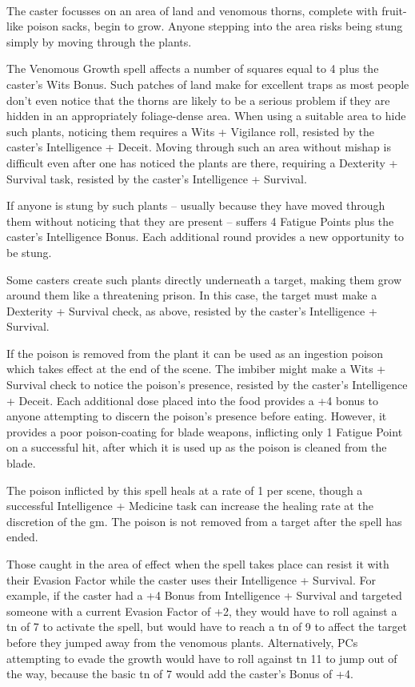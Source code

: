 \documentclass[titlepage,a4paper,openany]{book}
\begin{document}
\begin{multicols}{2}
\\
The caster focusses on an area of land and venomous thorns, complete with fruit-like poison sacks, begin to grow. Anyone stepping into the area risks being stung simply by moving through the plants.

The Venomous Growth spell affects a number of squares equal to 4 plus the caster's Wits Bonus. Such patches of land make for excellent traps as most people don't even notice that the thorns are likely to be a serious problem if they are hidden in an appropriately foliage-dense area. When using a suitable area to hide such plants, noticing them requires a Wits + Vigilance roll, resisted by the caster's Intelligence + Deceit. Moving through such an area without mishap is difficult even after one has noticed the plants are there, requiring a Dexterity + Survival task, resisted by the caster's Intelligence + Survival.

If anyone is stung by such plants -- usually because they have moved through them without noticing that they are present -- suffers 4 Fatigue Points plus the caster's Intelligence Bonus. Each additional \gls{round} provides a new opportunity to be stung.

Some casters create such plants directly underneath a target, making them grow around them like a threatening prison. In this case, the target must make a Dexterity + Survival check, as above, resisted by the caster's Intelligence + Survival.

If the poison is removed from the plant it can be used as an ingestion poison which takes effect at the end of the scene. The imbiber might make a Wits + Survival check to notice the poison's presence, resisted by the caster's Intelligence + Deceit. Each additional dose placed into the food provides a +4 bonus to anyone attempting to discern the poison's presence before eating. However, it provides a poor poison-coating for blade weapons, inflicting only 1 Fatigue Point on a successful hit, after which it is used up as the poison is cleaned from the blade.

The poison inflicted by this spell heals at a rate of 1 per scene, though a successful Intelligence + Medicine task can increase the healing rate at the discretion of the \gls{gm}. The poison is not removed from a target after the spell has ended.

Those caught in the area of effect when the spell takes place can resist it with their Evasion Factor while the caster uses their Intelligence + Survival. For example, if the caster had a +4 Bonus from Intelligence + Survival and targeted someone with a current Evasion Factor of +2, they would have to roll against a \gls{tn} of 7 to activate the spell, but would have to reach a \gls{tn} of 9 to affect the target before they jumped away from the venomous plants. Alternatively, PCs attempting to evade the growth would have to roll against \gls{tn} 11 to jump out of the way, because the basic \gls{tn} of 7 would add the caster's Bonus of +4.


\end{multicols}
\end{document}
